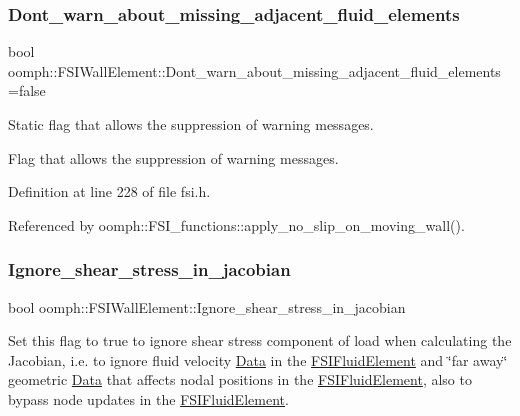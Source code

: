 \subsubsection{\texorpdfstring{Dont\+\_\+warn\+\_\+about\+\_\+missing\+\_\+adjacent\+\_\+fluid\+\_\+elements}{Dont\_warn\_about\_missing\_adjacent\_fluid\_elements}}
{\footnotesize\ttfamily bool oomph\+::\+F\+S\+I\+Wall\+Element\+::\+Dont\+\_\+warn\+\_\+about\+\_\+missing\+\_\+adjacent\+\_\+fluid\+\_\+elements =false\hspace{0.3cm}{\ttfamily [static]}}



Static flag that allows the suppression of warning messages. 

Flag that allows the suppression of warning messages. 

Definition at line 228 of file fsi.\+h.



Referenced by oomph\+::\+F\+S\+I\+\_\+functions\+::apply\+\_\+no\+\_\+slip\+\_\+on\+\_\+moving\+\_\+wall().

\mbox{\label{classoomph_1_1FSIWallElement_a5eb4d9f6c1d9c7745b4313a0a832fbb0}} 
\subsubsection{\texorpdfstring{Ignore\+\_\+shear\+\_\+stress\+\_\+in\+\_\+jacobian}{Ignore\_shear\_stress\_in\_jacobian}}
{\footnotesize\ttfamily bool oomph\+::\+F\+S\+I\+Wall\+Element\+::\+Ignore\+\_\+shear\+\_\+stress\+\_\+in\+\_\+jacobian\hspace{0.3cm}{\ttfamily [private]}}



Set this flag to true to ignore shear stress component of load when calculating the Jacobian, i.\+e. to ignore fluid velocity \hyperlink{classoomph_1_1Data}{Data} in the \hyperlink{classoomph_1_1FSIFluidElement}{F\+S\+I\+Fluid\+Element} and \char`\"{}far away\char`\"{} geometric \hyperlink{classoomph_1_1Data}{Data} that affects nodal positions in the \hyperlink{classoomph_1_1FSIFluidElement}{F\+S\+I\+Fluid\+Element}, also to bypass node updates in the \hyperlink{classoomph_1_1FSIFluidElement}{F\+S\+I\+Fluid\+Element}. 



